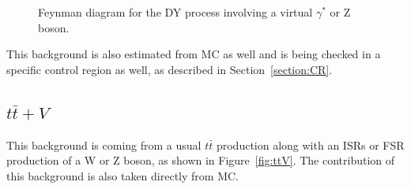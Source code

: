 \documentclass[a4paper, 10pt, openright]{report}
\begin{document}
\begin{figure}[htbp]
\centering
\begin{minipage}[b]{.34\textwidth}
\end{minipage} 
\caption{Feynman diagram for the \ac{DY} process involving a virtual $\gamma^*$ or Z boson.}
\label{fig:DY}
\end{figure}

This background is also estimated from \ac{MC} as well and is being checked in a specific control region as well, as described in Section~\ref{section:CR}.

\subsection{$t \bar t + V$} \label{subsection:ttV}

This background is coming from a usual $t \bar t$ production along with an \acp{ISR} or \ac{FSR} production of a W or Z boson, as shown in Figure~\ref{fig:ttV}. The contribution of this background is also taken directly from \ac{MC}.
\end{document}
